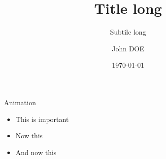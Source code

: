 \documentclass[aspectratio=169, 10pt]{beamer}
\title[shorttitle]{Title long}
\subtitle[shortsubtitle]{Subtile long}
\date[shortdate]{\today}
\author[john.doe@mail.com]{John DOE\inst{1}}
\institute[shortinstitute]{\inst{1} An Awesome Company}
\begin{document}

   \begin{frame}{Animation}
      \begin{itemize}[<+- | alert@+>]
         \item \alert<2>{This is important}
         \item Now this
         \item And now this
      \end{itemize}
   \end{frame}
\end{document}
